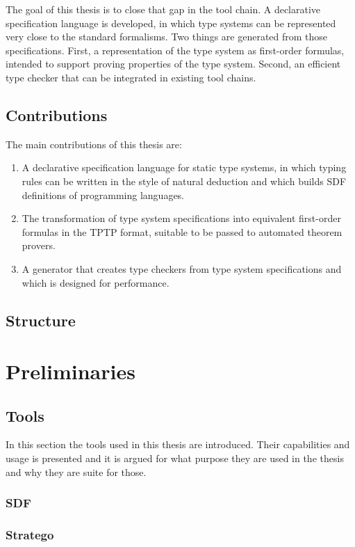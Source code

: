 \documentclass[a4paper,twoside]{report}
\begin{document}
The goal of this thesis is to close that gap in the tool chain. A
declarative specification language is developed, in which type systems
can be represented very close to the standard formalisms. Two things
are generated from those specifications. First, a representation of
the type system as first-order formulas, intended to support proving
properties of the type system. Second, an efficient type checker that
can be integrated in existing tool chains.
\section{Contributions}
The main contributions of this thesis are:
\begin{enumerate}
\item A declarative specification language for static type systems, in
  which typing rules can be written in the style of natural deduction
  and which builds SDF definitions of programming languages.
\item The transformation of type system specifications into equivalent
  first-order formulas in the TPTP format, suitable to be passed to
  automated theorem provers.
\item A generator that creates type checkers from type system
  specifications and which is designed for performance.
\end{enumerate}

\section{Structure}

\chapter{Preliminaries}
\section{Tools}
In this section the tools used in this thesis are introduced. Their
capabilities and usage is presented and it is argued for what purpose
they are used in the thesis and why they are suite for those.
\subsection{SDF}
\subsection{Stratego}
\end{document}
